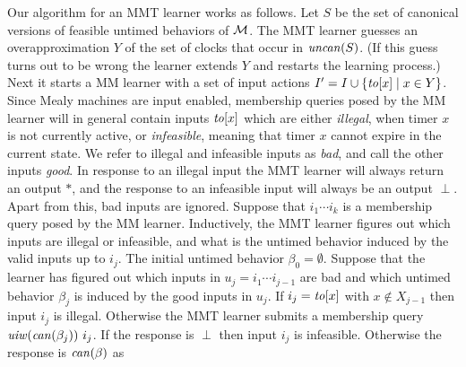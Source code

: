Our algorithm for an MMT learner works as follows.
Let $S$ be the set of canonical versions of feasible untimed behaviors of ${\cal M}$.
The MMT learner guesses an overapproximation $Y$ of the set of clocks that occur in $\mathit{uncan}({S})$.
(If this guess turns out to be wrong the learner extends $Y$ and restarts the learning process.)
Next it starts a MM learner with a set of input actions $I' = I \cup \{ \mathit{to}[x] \mid x \in Y \}$.
Since Mealy machines are input enabled, membership queries posed by the MM learner will in general contain
inputs $\mathit{to}[x]$ which are either \emph{illegal}, when timer $x$ is not currently active, or \emph{infeasible},
meaning that timer $x$ cannot expire in the current state.
We refer to illegal and infeasible inputs as \emph{bad}, and call the other inputs \emph{good}.
In response to an illegal input the MMT learner will always return an output $\ast$, and the response to an infeasible
input will always be an output $\perp$. Apart from this, bad inputs are ignored.
Suppose that $i_1 \cdots i_k$ is a membership query posed by the MM learner.
Inductively, the MMT learner figures out which inputs are illegal or infeasible, and what is the untimed behavior
induced by the valid inputs up to $i_j$.
The initial untimed behavior $\beta_0 = \emptyset$.
Suppose that the learner has figured out which inputs in $u_j = i_1 \cdots i_{j-1}$ are bad and which untimed behavior
$\beta_j$ is induced by the good inputs in $u_j$. If $i_j = \mathit{to}[x]$ with $x \not\in X_{j-1}$ then input $i_j$ is illegal.
Otherwise the MMT learner submits a membership query $\mathit{uiw}(\mathit{can}({\beta_j})) ~ i_j$.
If the response is $\perp$ then input $i_j$ is infeasible.
Otherwise the response is $\mathit{can}({\beta})$
as 

